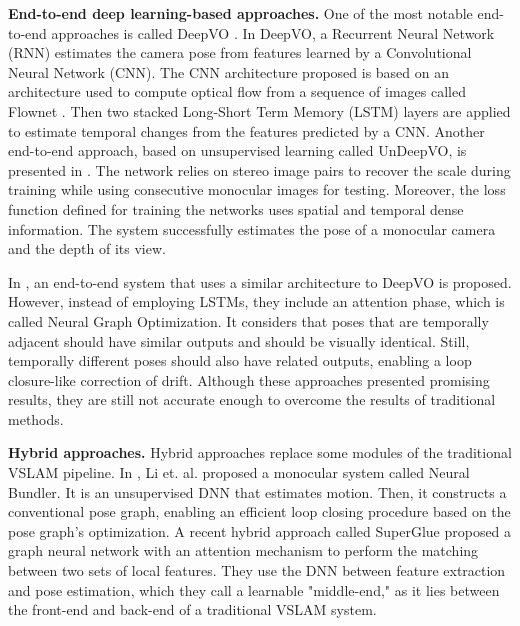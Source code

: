 \textbf{End-to-end deep learning-based approaches.} One of the most notable end-to-end approaches is called DeepVO \cite{deep-vo}. In DeepVO, a Recurrent Neural Network (RNN) estimates the camera pose from features learned by a Convolutional Neural Network (CNN). The CNN architecture proposed is based on an architecture used to compute optical flow from a sequence of images called Flownet \cite{flownet}. Then two stacked Long-Short Term Memory (LSTM) layers are applied to estimate temporal changes from the features predicted by a CNN. Another end-to-end approach, based on unsupervised learning called UnDeepVO, is presented in \cite{undeep-vo}. The network relies on stereo image pairs to recover the scale during training while using consecutive monocular images for testing. Moreover, the loss function defined for training the networks uses spatial and temporal dense information. The system successfully estimates the pose of a monocular camera and the depth of its view. 

In \cite{attention-based}, an end-to-end system that uses a similar architecture to DeepVO is proposed. However, instead of employing LSTMs, they include an attention phase, which is called Neural Graph Optimization. It considers that poses that are temporally adjacent should have similar outputs and should be visually identical. Still, temporally different poses should also have related outputs, enabling a loop closure-like correction of drift. Although these approaches presented promising results, they are still not accurate enough to overcome the results of traditional methods.

\textbf{Hybrid approaches.} Hybrid approaches replace some modules of the traditional VSLAM pipeline. In \cite{pose-graph-optimization}, Li et. al. proposed a monocular system called Neural Bundler. It is an unsupervised DNN that estimates motion. Then, it constructs a conventional pose graph, enabling an efficient loop closing procedure based on the pose graph's optimization. A recent hybrid approach called SuperGlue \cite{superglue} proposed a graph neural network with an attention mechanism to perform the matching between two sets of local features. They use the DNN between feature extraction and pose estimation, which they call a learnable "middle-end," as it lies between the front-end and back-end of a traditional VSLAM system. 

